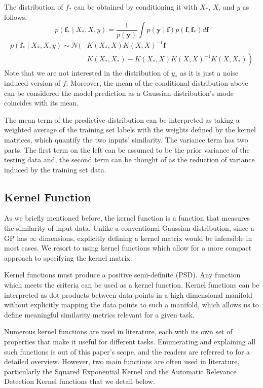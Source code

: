 \documentclass[letterpaper,11pt]{extarticle}
\begin{document}
The distribution of $f_*$ can be obtained by conditioning it with $X_*$, $X$, and $y$ as follows. 
$$
p(\mathbf{f_*} \mid X_*, X, y) = \frac{1}{p({\mathbf{y}})} \int p(\mathbf{y} \mid \mathbf{f}) p(\mathbf{f}, \mathbf{f_*}) d \mathbf{f}
$$
$$
\begin{aligned}
p(\mathbf{f_*} \mid X_*, X, y) \sim \mathcal{N}(& K\left(X_{*}, X\right) K(X, X)^{-1} \mathbf{f} \\
&\left.K\left(X_{*}, X_{*}\right)-K\left(X_{*}, X\right) K(X, X)^{-1} K\left(X, X_{*}\right)\right)
\end{aligned}
$$
Note that we are not interested in the distribution of $y_*$ as it is just a noise induced version of $f$. Moreover, the mean of the conditional distribution above can be considered the model prediction as a Gaussian distribution's mode coincides with its mean.

The mean term of the predictive distribution can be interpreted as taking a weighted average of the training set labels with the weights defined by the kernel matrices, which quantify the two inputs' similarity. The variance term has two parts. The first term on the left can be assumed to be the prior variance of the testing data and, the second term can be thought of as the reduction of variance induced by the training set data. 

\subsection{Kernel Function}
As we briefly mentioned before, the kernel function is a function that measures the similarity of input data.  Unlike a conventional Gaussian distribution, since a GP has $\infty$ dimensions, explicitly defining a kernel matrix would be infeasible in most cases. We resort to using kernel functions which allow for a more compact approach to specifying the kernel matrix. 

Kernel functions must produce a positive semi-definite (PSD). Any function which meets the criteria can be used as a kernel function. Kernel functions can be interpreted as dot products between data points in a high dimensional manifold without explicitly mapping the data points to such a manifold, which allows us to define meaningful similarity metrics relevant for a given task.  

Numerous kernel functions are used in literature, each with its own set of properties that make it useful for different tasks. Enumerating and explaining all such functions is out of this paper's scope, and the readers are referred to \cite{RasmussenW06} for a detailed overview. However, two main functions are often used in literature, particularly the Squared Exponential Kernel and the Automatic Relevance Detection Kernel functions that we detail below. 
\end{document}
